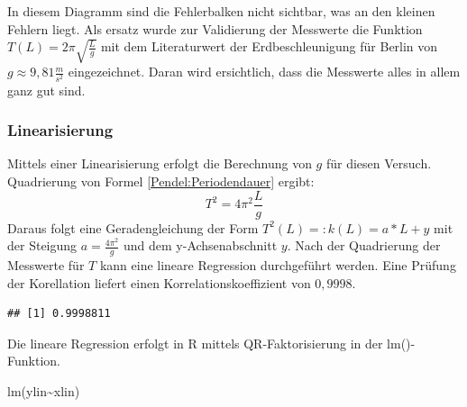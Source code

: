\documentclass[
  9pt,
]{article}
\newenvironment{Shaded}{\begin{snugshade}}{\end{snugshade}}
\newcommand{\AttributeTok}[1]{\textcolor[rgb]{0.77,0.63,0.00}{#1}}
\newcommand{\CommentTok}[1]{\textcolor[rgb]{0.56,0.35,0.01}{\textit{#1}}}
\newcommand{\DecValTok}[1]{\textcolor[rgb]{0.00,0.00,0.81}{#1}}
\newcommand{\FunctionTok}[1]{\textcolor[rgb]{0.00,0.00,0.00}{#1}}
\newcommand{\NormalTok}[1]{#1}
\newcommand{\OtherTok}[1]{\textcolor[rgb]{0.56,0.35,0.01}{#1}}
\newcommand{\SpecialCharTok}[1]{\textcolor[rgb]{0.00,0.00,0.00}{#1}}
\newcommand{\StringTok}[1]{\textcolor[rgb]{0.31,0.60,0.02}{#1}}
\begin{document}
In diesem Diagramm sind die Fehlerbalken nicht sichtbar, was an den
kleinen Fehlern liegt. Als ersatz wurde zur Validierung der Messwerte
die Funktion \(T(L)=2\pi\sqrt{\frac{L}{g}}\) mit dem Literaturwert der
Erdbeschleunigung für Berlin von \(g\approx 9,81\frac{m}{s^2}\)
eingezeichnet. Daran wird ersichtlich, dass die Messwerte alles in allem
ganz gut sind.

\hypertarget{linearisierung}{%
\subsubsection{Linearisierung}\label{linearisierung}}

Mittels einer Linearisierung erfolgt die Berechnung von \(g\) für diesen
Versuch. Quadrierung von Formel \ref{Pendel:Periodendauer} ergibt:
\[T^2 = 4\pi^2\frac{L}{g}\] Daraus folgt eine Geradengleichung der Form
\(T^2(L)=:k(L)=a*L+y\) mit der Steigung \(a=\frac{4\pi^2}{g}\) und dem
y-Achsenabschnitt \(y\). Nach der Quadrierung der Messwerte für \(T\)
kann eine lineare Regression durchgeführt werden. Eine Prüfung der
Korellation liefert einen Korrelationskoeffizient von \(0,9998\).

\begin{Shaded}
\end{Shaded}

\begin{verbatim}
## [1] 0.9998811
\end{verbatim}

Die lineare Regression erfolgt in R mittels QR-Faktorisierung in der
lm()-Funktion.

\begin{Shaded}
\begin{Highlighting}[]
\FunctionTok{lm}\NormalTok{(ylin}\SpecialCharTok{\textasciitilde{}}\NormalTok{xlin)}
\end{Highlighting}
\end{Shaded}
\end{document}
